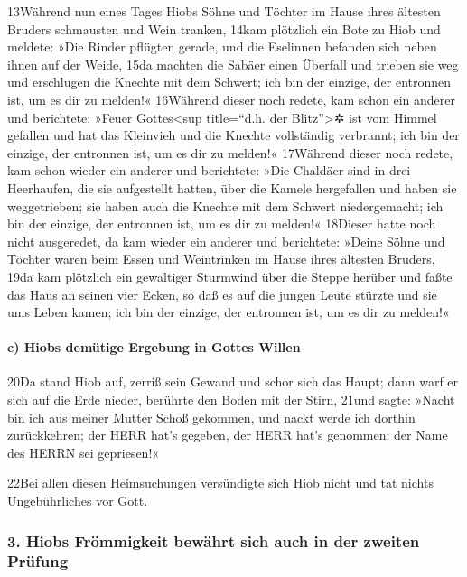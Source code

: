 13Während nun eines Tages Hiobs Söhne und Töchter im Hause ihres
ältesten Bruders schmausten und Wein tranken, 14kam plötzlich ein Bote
zu Hiob und meldete: »Die Rinder pflügten gerade, und die Eselinnen
befanden sich neben ihnen auf der Weide, 15da machten die Sabäer einen
Überfall und trieben sie weg und erschlugen die Knechte mit dem Schwert;
ich bin der einzige, der entronnen ist, um es dir zu melden!« 16Während
dieser noch redete, kam schon ein anderer und berichtete: »Feuer
Gottes\textless sup title=``d.h. der Blitz''\textgreater✲ ist vom Himmel
gefallen und hat das Kleinvieh und die Knechte vollständig verbrannt;
ich bin der einzige, der entronnen ist, um es dir zu melden!« 17Während
dieser noch redete, kam schon wieder ein anderer und berichtete: »Die
Chaldäer sind in drei Heerhaufen, die sie aufgestellt hatten, über die
Kamele hergefallen und haben sie weggetrieben; sie haben auch die
Knechte mit dem Schwert niedergemacht; ich bin der einzige, der
entronnen ist, um es dir zu melden!« 18Dieser hatte noch nicht
ausgeredet, da kam wieder ein anderer und berichtete: »Deine Söhne und
Töchter waren beim Essen und Weintrinken im Hause ihres ältesten
Bruders, 19da kam plötzlich ein gewaltiger Sturmwind über die Steppe
herüber und faßte das Haus an seinen vier Ecken, so daß es auf die
jungen Leute stürzte und sie ums Leben kamen; ich bin der einzige, der
entronnen ist, um es dir zu melden!«

\hypertarget{c-hiobs-demuxfctige-ergebung-in-gottes-willen}{%
\paragraph{c) Hiobs demütige Ergebung in Gottes
Willen}\label{c-hiobs-demuxfctige-ergebung-in-gottes-willen}}

20Da stand Hiob auf, zerriß sein Gewand und schor sich das Haupt; dann
warf er sich auf die Erde nieder, berührte den Boden mit der Stirn,
21und sagte: »Nacht bin ich aus meiner Mutter Schoß gekommen, und nackt
werde ich dorthin zurückkehren; der HERR hat's gegeben, der HERR hat's
genommen: der Name des HERRN sei gepriesen!«

22Bei allen diesen Heimsuchungen versündigte sich Hiob nicht und tat
nichts Ungebührliches vor Gott.

\hypertarget{hiobs-fruxf6mmigkeit-bewuxe4hrt-sich-auch-in-der-zweiten-pruxfcfung}{%
\subsubsection{3. Hiobs Frömmigkeit bewährt sich auch in der zweiten
Prüfung}\label{hiobs-fruxf6mmigkeit-bewuxe4hrt-sich-auch-in-der-zweiten-pruxfcfung}}

